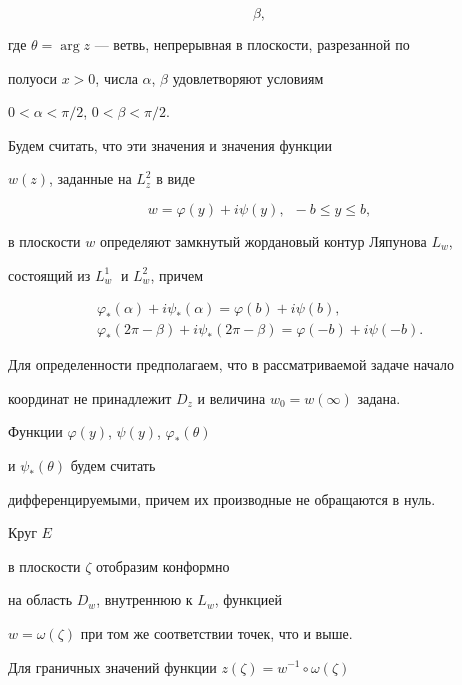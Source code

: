 {\begin{equation}
\beta,


\end{equation}


где $\theta =\arg z$ --- ветвь, непрерывная в плоскости, разрезанной по 


полуоси $x>0$, числа $\alpha$, $\beta$ удовлетворяют условиям


$0 <\alpha <\pi/2$, $0 <\beta <\pi/2$.





Будем считать, что эти значения и значения функции


$w(z)$, заданные на $L_{z}^{2} $ в виде


$$


w=\varphi (y) +i\psi (y),\ \;-b\leq y\leq b,


$$


в плоскости $w$ определяют замкнутый жордановый контур Ляпунова $L_{w}$,


состоящий из $L_{w}^{1}\;$ и $L_{w}^{2}$, причем


\begin{gather*}


\varphi_{*}(\alpha) +i\psi_{*}(\alpha)=\varphi (b)+i\psi(b), \\


\varphi_{*}(2\pi -\beta) +i\psi_{*}(2\pi -\beta)=\varphi (-b)+


i\psi(-b).


\end{gather*}





Для определенности предполагаем, что в рассматриваемой задаче начало 


координат не принадлежит $D_z$ и величина $w_0=w(\infty)$ задана.


Функции $\varphi (y)$, $\psi(y)$, $\varphi_* (\theta)$


и $\psi_*(\theta)$ будем считать 


дифференцируемыми, причем их производные не обращаются в нуль. 


Круг $E$


в плоскости $\zeta$ отобразим конформно


на область $D_{w}$, внутреннюю к $L_{w}$, функцией


$w=\omega (\zeta)$ при том же соответствии точек, что и выше.


Для граничных значений функции $z(\zeta)=w^{-1}\circ\omega(\zeta)$


}
